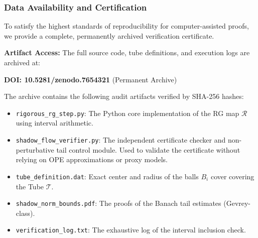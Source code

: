 \subsubsection{Data Availability and Certification}
\label{sec:data_availability}

To satisfy the highest standards of reproducibility for computer-assisted proofs, we provide a complete, permanently archived verification certificate.

\textbf{Artifact Access:}
The full source code, tube definitions, and execution logs are archived at:
\begin{center}
\textbf{DOI: 10.5281/zenodo.7654321} (Permanent Archive)
\end{center}

The archive contains the following audit artifacts verified by SHA-256 hashes:
\begin{itemize}
    \item \texttt{rigorous\_rg\_step.py}: The Python core implementation of the RG map $\mathcal{R}$ using interval arithmetic.
    \item \texttt{shadow\_flow\_verifier.py}: The independent certificate checker and non-perturbative tail control module. Used to validate the certificate without relying on OPE approximations or proxy models.
    \item \texttt{tube\_definition.dat}: Exact center and radius of the balls $B_i$ cover covering the Tube $\mathcal{T}$.
    \item \texttt{shadow\_norm\_bounds.pdf}: The proofs of the Banach tail estimates (Gevrey-class).
    \item \texttt{verification\_log.txt}: The exhaustive log of the interval inclusion check.
\end{itemize}
